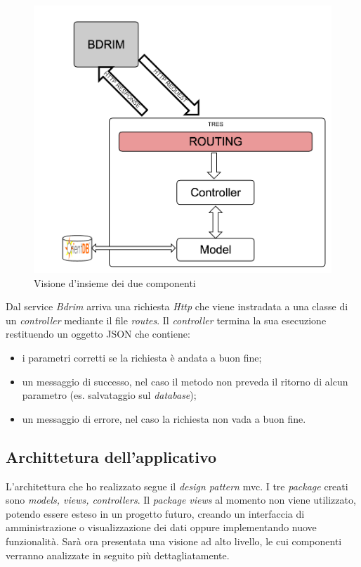 \begin{figure}[h]
\centering
\includegraphics[width=1\linewidth]{immagini/generalGliffy}
\caption[Visione d'insieme dei due componenti]{Visione d'insieme dei due componenti}
\label{fig:generalGliffy}
\end{figure}

\newpage
Dal service \textit{Bdrim} arriva una richiesta \textit{Http} che viene instradata a una classe di un \textit{controller}  mediante il file \textit{routes}. Il \textit{controller} termina la sua esecuzione restituendo un oggetto \gls{JSON} che contiene:
\begin{itemize}
	\item i parametri corretti se la richiesta è andata a buon fine;
	\item un messaggio di successo, nel caso il metodo non preveda il ritorno di alcun parametro (es. salvataggio sul \textit{database});
	\item un messaggio di errore, nel caso la richiesta non vada a buon fine.
\end{itemize}

\subsection{Archittetura dell'applicativo}
L'architettura che ho realizzato segue il \textit{design pattern} \gls{mvc}. I tre \textit{package} creati sono \textit{models, views, controllers}. Il \textit{package views} al momento non viene utilizzato, potendo essere esteso in un progetto futuro, creando un interfaccia di amministrazione o visualizzazione dei dati oppure implementando nuove funzionalità. Sarà ora presentata una visione ad alto livello, le cui componenti verranno analizzate in seguito più dettagliatamente.


